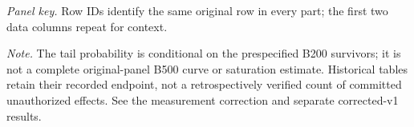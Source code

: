 \noindent\textit{Panel key.} Row IDs identify the same original row in every part; the first two data columns repeat for context.
\par\smallskip
\noindent\textit{Note.} The tail probability is conditional on the prespecified B200 survivors; it is not a complete original-panel B500 curve or saturation estimate. Historical tables retain their recorded endpoint, not a retrospectively verified count of committed un\-au\-thor\-ized effects. See the measurement correction and separate corrected-v1 results.
\endgroup
